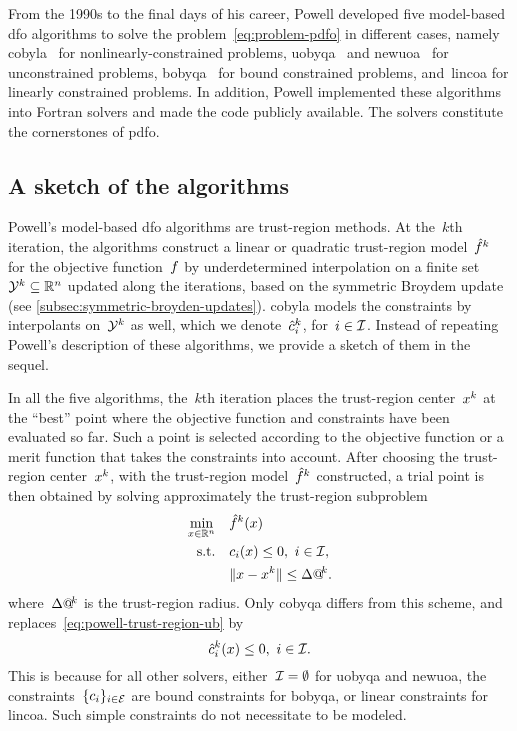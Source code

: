 From the 1990s to the final days of his career, Powell developed five model-based \gls{dfo} algorithms to solve the problem~\cref{eq:problem-pdfo} in different cases, namely \gls{cobyla}~\cite{Powell_1994} for nonlinearly-constrained problems, \gls{uobyqa}~\cite{Powell_2002} and \gls{newuoa}~\cite{Powell_2006} for unconstrained problems, \gls{bobyqa}~\cite{Powell_2009} for bound constrained problems, and~\gls{lincoa} for linearly constrained problems.
In addition, Powell implemented these algorithms into Fortran solvers and made the code publicly available.
The solvers constitute the cornerstones of \gls{pdfo}.

\subsection{A sketch of the algorithms}

Powell's model-based \gls{dfo} algorithms are trust-region methods.
At the~$k$th iteration, the algorithms construct a linear or quadratic trust-region model~$\objm[k]$ for the objective function~$f$ by underdetermined interpolation on a finite set~$\xpt[k] \subseteq \R^n$ updated along the iterations, based on the symmetric Broydem update (see \cref{subsec:symmetric-broyden-updates}).
\Gls{cobyla} models the constraints by interpolants on~$\xpt[k]$ as well, which we denote~$\conm[k]{i}$, for~$i \in \mathcal{I}$.
Instead of repeating Powell's description of these algorithms, we provide a sketch of them in the sequel.

In all the five algorithms, the~$k$th iteration places the trust-region center~$\iter[k]$ at the \enquote{best} point where the objective function and constraints have been evaluated so far.
Such a point is selected according to the objective function or a merit function that takes the constraints into account.
After choosing the trust-region center~$\iter[k]$, with the trust-region model~$\objm[k]$ constructed, a trial point is then obtained by solving approximately the trust-region subproblem
\begin{subequations}
    \label{eq:powell-trust-region}
    \begin{align}
        \min_{\iter \in \R^n}   & \quad \objm[k](\iter)\\
        \text{s.t.}             & \quad \con{i}(\iter) \le 0, ~ i \in \iub, \label{eq:powell-trust-region-ub}\\
                                & \quad \norm{\iter - \iter[k]} \le \rad[k].
    \end{align}
\end{subequations}
where~$\rad[k]$ is the trust-region radius.
Only \gls{cobyqa} differs from this scheme, and replaces~\cref{eq:powell-trust-region-ub} by
\begin{equation*}
    \conm[k]{i}(\iter) \le 0, ~ i \in \iub.
\end{equation*}
This is because for all other solvers, either~$\mathcal{I} = \emptyset$ for \gls{uobyqa} and \gls{newuoa}, the constraints~$\{c_{i}\}_{i \in \mathcal{E}}$ are bound constraints for \gls{bobyqa}, or linear constraints for \gls{lincoa}.
Such simple constraints do not necessitate to be modeled.

